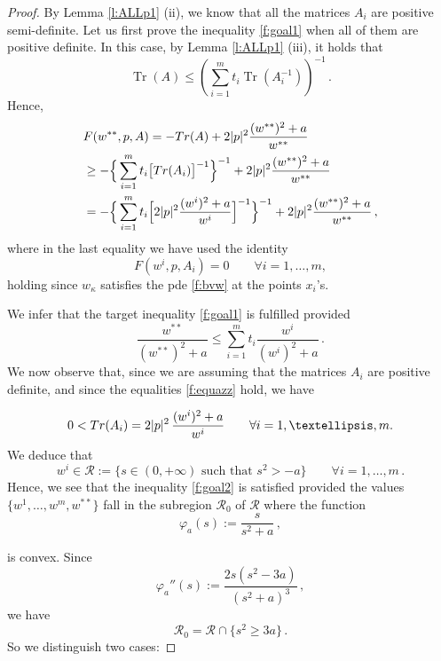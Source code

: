 \documentclass[10pt,a4paper]{amsart}
\DeclareMathOperator{\Tr}{Tr}
\def\k{\kappa}
\begin{document}
\begin{proof}
 
By Lemma \ref{l:ALLp1} (ii), we know that all the matrices $A_i$ are positive semi-definite.  
  Let us first prove the inequality \eqref{f:goal1} when  all of them are 
positive definite. 
In this case,  by Lemma \ref{l:ALLp1}  (iii),  it holds that
 $$\Tr(A) \leq 
\left(\sum_{i=1}^m t_i \Tr (A_i^{-1})\right)^{-1}\,. $$ 
 Hence,  $$\begin{aligned} 
& F (w^{**}, p, A )  
 =  - {\rm Tr} ( A)  +  2 |p| ^ 2 \frac{(w^{**} ) ^ 2 + a}{w ^ {**}}   \\ 
 & \geq   - \Big \{  \sum _ { i = 1} ^ m  t _i  \big [  {\rm Tr} (A _i )   \big ]   ^ { -1}   \Big \} ^ { -1}  
 + 2 |p| ^ 2 \frac{(w^{**} ) ^ 2 + a}{w ^ {**}}    \\ 
 & =   - \Big \{  \sum _ { i = 1} ^ m  t _i  
 \Big [  2 |p| ^ 2 \frac{(w^{i} ) ^ 2 + a}{w ^ {i}}   \Big ]      ^ { -1}   \Big \} ^ { -1}   + 2 |p| ^ 2 \frac{(w^{**} ) ^ 2 + a}{w ^ {**}}     \,,
   \end{aligned} 
 $$ 
 where in the last equality we have used the identity
  \begin{equation}\label{f:equazz} 
   F (w^i, p, A_i ) = 0 \qquad \forall i = 1, \dots, m, 
 \end{equation}
  holding since $w _\k $ satisfies the pde  \eqref{f:bvw}
 at the points $x _i$'s.   
 
 
 We infer that the target inequality \eqref{f:goal1} is fulfilled provided
 \begin{equation}\label{f:goal2} \frac{w^{**}}{(w^{**}) ^ 2  + a } 
 \leq \sum _ { i = 1} ^ m  t _i  
 \frac{w^i} { (w^{i} ) ^ 2  + a   }  \,.
 \end{equation} 
We now observe that, since we are assuming that the matrices $A_i$ are positive definite, and since
the equalities \eqref{f:equazz}  hold, we have 

 $$0 < {\rm Tr} ( A_i) = 2 |p | ^ 2 \, \frac {(w^ {i} ) ^ 2  + a  }{w^ i}   \qquad \forall i = 1, \dots, m.$$ 
 We deduce that 
 \begin{equation}\label{f:app} 
 w ^ i \in \mathcal R:=  \big \{  s \in (0,   + \infty)  \text{ such that } s ^ 2 > - a  \big \} \qquad \forall i = 1, \dots, m \,.
 \end{equation} Hence, we see that
the inequality \eqref{f:goal2} is satisfied provided  the values $\{w^ 1, \dots, w ^m, w ^{**}\}$ fall in the subregion $\mathcal R_0$ of $\mathcal R$ where the function 
 $$\varphi _ a ( s):= \frac{s}{ s ^ 2 + a  }\,,$$ 
 
is convex. 
 Since 
 $$\varphi _ a''  ( s):= \frac{2s (s^2- 3a)}{ (s ^ 2 + a ) ^ 3  } \,,$$ 
 we have
 $${\mathcal R}_0=  \mathcal R \cap \{ s^2 \geq 3 a \}  \,.$$ 
 So we distinguish two cases:
 

\end{proof}
\end{document}
